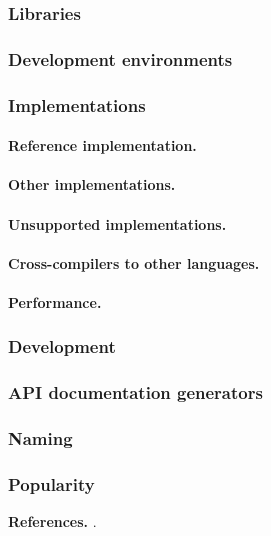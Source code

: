 \documentclass{article}
\numberwithin{equation}{section}
\begin{document}
\subsubsection{Libraries}

\subsubsection{Development environments}

\subsubsection{Implementations}

\paragraph{Reference implementation.}

\paragraph{Other implementations.}

\paragraph{Unsupported implementations.}

\paragraph{Cross-compilers to other languages.}

\paragraph{Performance.}

\subsubsection{Development}

\subsubsection{API documentation generators}

\subsubsection{Naming}

\subsubsection{Popularity}


\textbf{References.} \cite{Knuth1997, Matthes2019}.

\printbibliography[heading=bibintoc]
	
\end{document}
